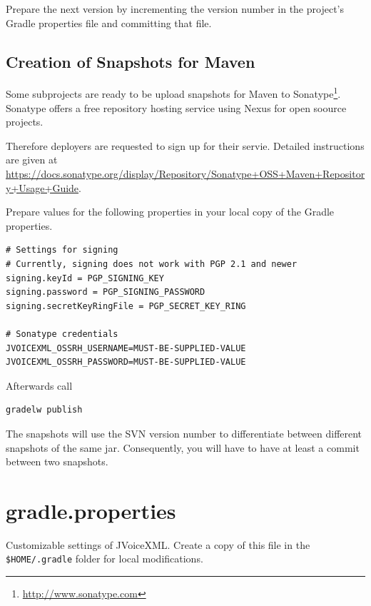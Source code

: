 \documentclass[11pt,a4paper]{article}
\begin{document}
Prepare the next version by incrementing the version number in the project's Gradle
properties file  and committing that file.

\subsection{Creation of Snapshots for Maven}

Some subprojects are ready to be upload snapshots for Maven to
Sonatype\footnote{\url{http://www.sonatype.com}}. Sonatype offers
a free repository hosting service using Nexus for open soource projects.

Therefore deployers are requested to sign up for their servie. Detailed
instructions are given at \url{https://docs.sonatype.org/display/Repository/Sonatype+OSS+Maven+Repository+Usage+Guide}.

Prepare values for the following properties in your local copy of the Gradle properties.

\begin{lstlisting}[language=XML]
# Settings for signing
# Currently, signing does not work with PGP 2.1 and newer
signing.keyId = PGP_SIGNING_KEY
signing.password = PGP_SIGNING_PASSWORD
signing.secretKeyRingFile = PGP_SECRET_KEY_RING

# Sonatype credentials
JVOICEXML_OSSRH_USERNAME=MUST-BE-SUPPLIED-VALUE
JVOICEXML_OSSRH_PASSWORD=MUST-BE-SUPPLIED-VALUE
\end{lstlisting}

Afterwards call 
\begin{lstlisting}
gradelw publish
\end{lstlisting}

The snapshots will use the SVN version number to differentiate between different
snapshots of the same jar. Consequently, you will have to have at least
a commit between two snapshots.




\newpage

\appendix

\section{gradle.properties}
\label{sec:gradle-properties}

Customizable settings of JVoiceXML. Create a copy of this file in the
\texttt{\$HOME/.gradle} folder for local modifications.


\end{document}
